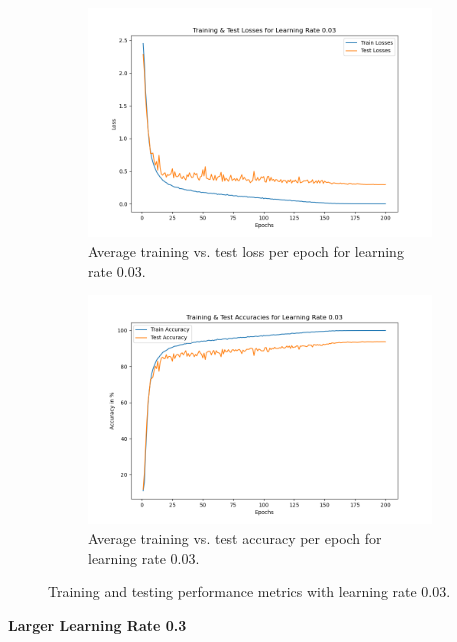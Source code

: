 \begin{figure}[H]
    \centering
    \begin{subfigure}[t]{0.48\textwidth}
        \centering
        \includegraphics[width=\textwidth]{images/ex_2_losses_003}
        \caption{Average training vs. test loss per epoch for learning rate 0.03.}
    \end{subfigure}
    \hfill
    \begin{subfigure}[t]{0.48\textwidth}
        \centering
        \includegraphics[width=\textwidth]{images/ex_2_accuracies_003}
        \caption{Average training vs. test accuracy per epoch for learning rate 0.03.}
    \end{subfigure}
    \caption{Training and testing performance metrics with learning rate 0.03.}
\end{figure}

\textbf{Larger Learning Rate 0.3}

